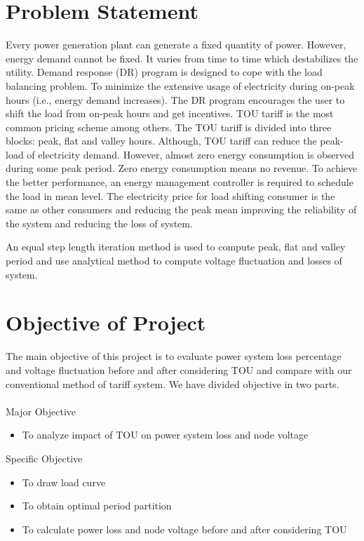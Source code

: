 \documentclass[12pt]{article}
\begin{document}
\section{Problem Statement}
Every power generation plant can generate a fixed quantity of power. However,
energy demand cannot be fixed. It varies from time to time which destabilizes the
utility. Demand response (DR) program is designed to cope with the load balancing problem. To minimize the extensive usage of electricity during on-peak hours
(i.e., energy demand increases). The DR program encourages the user to shift
the load from on-peak hours and get incentives. TOU tariff is the most common
pricing scheme among others. The TOU tariff is divided into three blocks: peak,
flat and valley hours. Although, TOU tariff can reduce the peak-load of electricity demand. However, almost zero energy consumption is observed during some
peak period. Zero energy consumption means no revenue. To achieve the better
performance, an energy management controller is required to schedule the load in
mean level. The electricity price for load shifting consumer is the same as other
consumers and reducing the peak mean improving the reliability of the system and
reducing the loss of system.

An equal step length iteration method is used to compute peak, flat and valley
period and use analytical method to compute voltage fluctuation and losses of
system.
\pagebreak
\section{Objective of  Project}
The main objective of this project is to evaluate power system loss percentage
and voltage fluctuation before and after considering TOU and compare with our
conventional method of tariff system. We have divided objective in two parts.\\
\\
Major  Objective
\begin{itemize}
\item To analyze impact of TOU on power system loss and node voltage
\end{itemize}
Specific Objective
\begin{itemize}
\item To draw load curve
\item To obtain optimal period partition
\item To calculate power loss and node voltage before and after considering TOU
\end{itemize}
\end{document}

